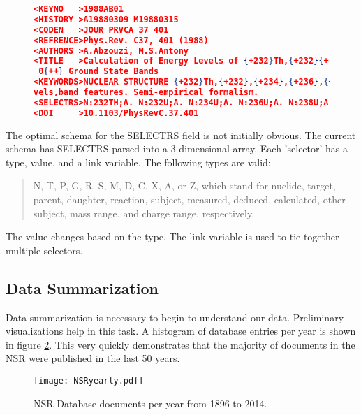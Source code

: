 \documentclass[12pt]{article}
\begin{document}
\begin{doublespacing}
\begin{figure}[!hb] \label{exNSR}
\begin{lstlisting}[language=json,firstnumber=1]
<KEYNO   >1988AB01                                                              &
<HISTORY >A19880309 M19880315                                                   &
<CODEN   >JOUR PRVCA 37 401                                                     &
<REFRENCE>Phys.Rev. C37, 401 (1988)                                             &
<AUTHORS >A.Abzouzi, M.S.Antony                                                 &
<TITLE   >Calculation of Energy Levels of {+232}Th,{+232}{+-}{+238}U for K(|p) =&
 0{++} Ground State Bands                                                       &
<KEYWORDS>NUCLEAR STRUCTURE {+232}Th,{+232},{+234},{+236},{+238}U; calculated le&
vels,band features. Semi-empirical formalism.                                   &
<SELECTRS>N:232TH;A. N:232U;A. N:234U;A. N:236U;A. N:238U;A. C:OTHER;A.         &
<DOI     >10.1103/PhysRevC.37.401                                               &
\end{lstlisting} \end{figure}

The optimal schema for the SELECTRS field is not initially obvious.
The current schema has SELECTRS parsed into a 3 dimensional array.
Each 'selector' has a type, value, and a link variable.
The following types are valid:
\begin{quote}
N, T, P, G, R, S, M, D, C, X, A, or Z, which stand for nuclide, target, parent, daughter, reaction, subject, measured, deduced, calculated, other subject, mass range, and charge range, respectively.
\end{quote}
The value changes based on the type. The link variable is used to tie together multiple selectors.

\subsection{Data Summarization}
Data summarization is necessary to begin to understand our data.
Preliminary visualizations help in this task.
A histogram of database entries per year is shown in figure \ref{fig:NSRyearly}.
This very quickly demonstrates that the majority of documents in the NSR were published in the last 50 years.

\begin{figure}[!hb]
    \label{fig:NSRyearly}
    \centering
    \texttt{[image: NSRyearly.pdf]}
    \caption{NSR Database documents per year from 1896 to 2014.}
\end{figure}


\end{doublespacing}
\end{document}
